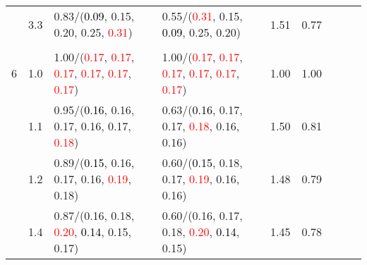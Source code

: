 \documentclass[10pt,a4paper]{report}
\begin{document}
\begin{table}[!htbp]
\begin{center}
{\begin{tabular}{ccllccccc}
				  & 3.3                               & 0.83/(\textcolor{black}{0.09}, 0.15, 0.20, 0.25, \textcolor{red}{0.31})                                                                                                                       & 0.55/(\textcolor{red}{0.31}, 0.15, \textcolor{black}{0.09}, 0.25, 0.20)                                                                                                                       & 1.51             & 0.77                     \\
				  &                                   &                                                                                                                                                                                               &                                                                                                                                                                                               &                                             \\
				6 & 1.0                               & 1.00/(\textcolor{red}{0.17}, \textcolor{red}{0.17}, \textcolor{red}{0.17}, \textcolor{red}{0.17}, \textcolor{red}{0.17}, \textcolor{red}{0.17})                                               & 1.00/(\textcolor{red}{0.17}, \textcolor{red}{0.17}, \textcolor{red}{0.17}, \textcolor{red}{0.17}, \textcolor{red}{0.17}, \textcolor{red}{0.17})                                               & 1.00             & 1.00                     \\
				  & 1.1                               & 0.95/(\textcolor{black}{0.16}, 0.16, 0.17, 0.16, 0.17, \textcolor{red}{0.18})                                                                                                                 & 0.63/(\textcolor{black}{0.16}, 0.17, 0.17, \textcolor{red}{0.18}, 0.16, 0.16)                                                                                                                 & 1.50             & 0.81                     \\
				  & 1.2                               & 0.89/(\textcolor{black}{0.15}, 0.16, 0.17, 0.16, \textcolor{red}{0.19}, 0.18)                                                                                                                 & 0.60/(\textcolor{black}{0.15}, 0.18, 0.17, \textcolor{red}{0.19}, 0.16, 0.16)                                                                                                                 & 1.48             & 0.79                     \\
				  & 1.4                               & 0.87/(0.16, 0.18, \textcolor{red}{0.20}, \textcolor{black}{0.14}, 0.15, 0.17)                                                                                                                 & 0.60/(0.16, 0.17, 0.18, \textcolor{red}{0.20}, \textcolor{black}{0.14}, 0.15)                                                                                                                 & 1.45             & 0.78                     \\

\end{tabular}}
\end{center}
\end{table}
\end{document}
